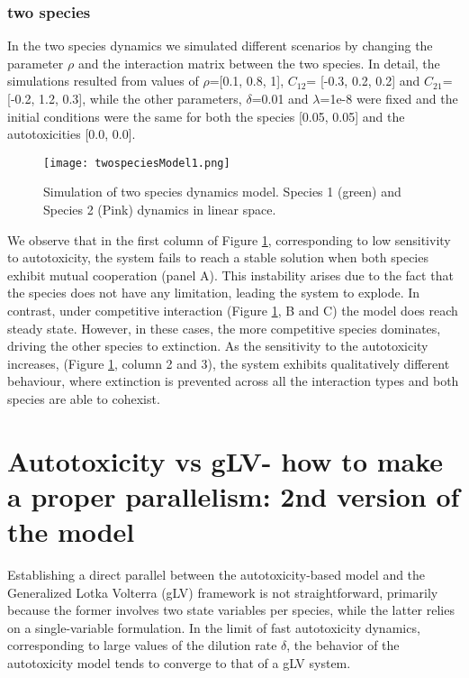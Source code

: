 \documentclass[11pt,a4paper,fleqn]{article}
\begin{document}
\subsubsection{two species}
In the two species dynamics we simulated different scenarios by changing the parameter $\rho$ and the interaction matrix between the two species. 
In detail, the simulations resulted from values of $\rho$=[0.1, 0.8, 1],  ${C}_{12}$= [-0.3, 0.2, 0.2] and ${C}_{21}$=[-0.2, 1.2, 0.3],
while the other parameters, $\delta$=0.01 and $\lambda$=1e-8 were fixed and the initial conditions were the same for both the species [0.05, 0.05] and the autotoxicities [0.0, 0.0].
\begin{figure}[h]
    \centering
    \texttt{[image: twospeciesModel1.png]}
    \caption{\label{simulationTwoSpeciesModel0} Simulation of two species dynamics model. Species 1 (green) and Species 2 (Pink) dynamics in linear space.}
\end{figure}

We observe that in the first column of Figure \ref{simulationTwoSpeciesModel0}, 
corresponding to low sensitivity to autotoxicity, 
the system fails to reach a stable solution when both species exhibit mutual cooperation (panel A).
This instability arises due to the fact that the species does not have any limitation, leading the system to explode.
In contrast, under competitive interaction (Figure \ref{simulationTwoSpeciesModel0}, B and C) 
the model does reach steady state. However, in these cases, the more competitive species
dominates, driving the other species to extinction. 
As the sensitivity to the autotoxicity increases, (Figure \ref{simulationTwoSpeciesModel0}, column 2 and 3), 
the system exhibits qualitatively different behaviour, where extinction is prevented across all the interaction types
and both species are able to cohexist.
\clearpage

\section{Autotoxicity vs gLV- how to make a proper parallelism: 2nd version of the model}
Establishing a direct parallel between the autotoxicity-based model and the Generalized Lotka Volterra (gLV) framework is not straightforward, 
primarily because the former involves two state variables per species, while the latter relies on a single-variable formulation. 
In the limit of fast autotoxicity dynamics, corresponding to large values of the dilution rate $\delta$, 
the behavior of the autotoxicity model tends to converge to that of a gLV system.
\end{document}

